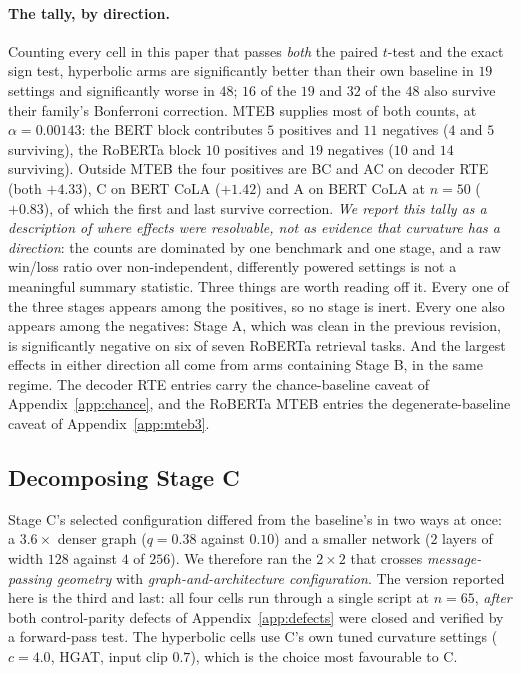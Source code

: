 \documentclass{article}
\begin{document}
\paragraph{The tally, by direction.} Counting every cell in this paper that
passes \emph{both} the paired $t$-test and the exact sign test, hyperbolic arms
are significantly better than their own baseline in $19$ settings and
significantly worse in $48$; $16$ of the $19$ and $32$ of the $48$ also survive
their family's Bonferroni correction. MTEB supplies most of both counts, at
$\alpha=0.00143$: the BERT block contributes $5$ positives and $11$ negatives
($4$ and $5$ surviving), the RoBERTa block $10$ positives and $19$ negatives
($10$ and $14$ surviving). Outside MTEB the four positives are BC and AC on
decoder RTE (both $+4.33$), C on BERT CoLA ($+1.42$) and A on BERT CoLA at
$n{=}50$ ($+0.83$), of which the first and last survive correction.
\emph{We report this tally as a description of where effects were resolvable,
not as evidence that curvature has a direction}: the counts are dominated by
one benchmark and one stage, and a raw win/loss ratio over non-independent,
differently powered settings is not a meaningful summary statistic. Three
things are worth reading off it. Every one of the three stages appears among
the positives, so no stage is inert. Every one also appears among the negatives:
Stage A, which was clean in the previous revision, is significantly negative on
six of seven RoBERTa retrieval tasks. And the largest effects in either
direction all come from arms containing Stage B, in the same regime. The decoder
RTE entries carry the chance-baseline caveat of Appendix~\ref{app:chance}, and
the RoBERTa MTEB entries the degenerate-baseline caveat of
Appendix~\ref{app:mteb3}.

\subsection{Decomposing Stage C}
\label{app:factorial2x2}

Stage C's selected configuration differed from the baseline's in two ways at
once: a $3.6\times$ denser graph ($q=0.38$ against $0.10$) and a smaller network
($2$ layers of width $128$ against $4$ of $256$). We therefore ran the
$2\times2$ that crosses \emph{message-passing geometry} with
\emph{graph-and-architecture configuration}. The version reported here is the
third and last: all four cells run through a single script at $n=65$,
\emph{after} both control-parity defects of Appendix~\ref{app:defects} were
closed and verified by a forward-pass test. The hyperbolic cells use C's own
tuned curvature settings ($c = 4.0$, HGAT, input clip $0.7$), which is the
choice most favourable to C.
\end{document}
